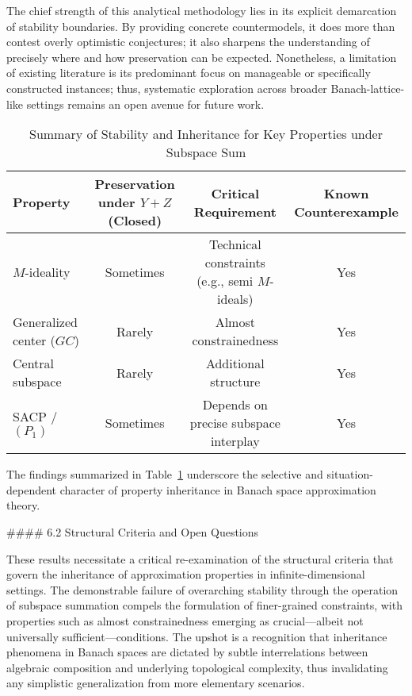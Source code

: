 \documentclass[11pt]{article}
\begin{document}
The chief strength of this analytical methodology lies in its explicit demarcation of stability boundaries. By providing concrete countermodels, it does more than contest overly optimistic conjectures; it also sharpens the understanding of precisely where and how preservation can be expected. Nonetheless, a limitation of existing literature is its predominant focus on manageable or specifically constructed instances; thus, systematic exploration across broader Banach-lattice-like settings remains an open avenue for future work.

\begin{table}[ht]
\centering
\caption{Summary of Stability and Inheritance for Key Properties under Subspace Sum}
\label{tab:inheritance_summary}
\begin{tabular}{|l|c|c|c|}
\hline
\textbf{Property} & \textbf{Preservation under $Y+Z$ (Closed)} & \textbf{Critical Requirement} & \textbf{Known Counterexample} \\
\hline
$M$-ideality        & Sometimes                    & Technical constraints (e.g., semi $M$-ideals)   & Yes \\
Generalized center ($GC$)   & Rarely                       & Almost constrainedness                        & Yes \\
Central subspace    & Rarely                       & Additional structure                           & Yes \\
SACP / $(P_1)$      & Sometimes                    & Depends on precise subspace interplay          & Yes \\
\hline
\end{tabular}
\end{table}

The findings summarized in Table~\ref{tab:inheritance_summary} underscore the selective and situation-dependent character of property inheritance in Banach space approximation theory.

#### 6.2 Structural Criteria and Open Questions

These results necessitate a critical re-examination of the structural criteria that govern the inheritance of approximation properties in infinite-dimensional settings. The demonstrable failure of overarching stability through the operation of subspace summation compels the formulation of finer-grained constraints, with properties such as almost constrainedness emerging as crucial—albeit not universally sufficient—conditions. The upshot is a recognition that inheritance phenomena in Banach spaces are dictated by subtle interrelations between algebraic composition and underlying topological complexity, thus invalidating any simplistic generalization from more elementary scenarios.
\end{document}
